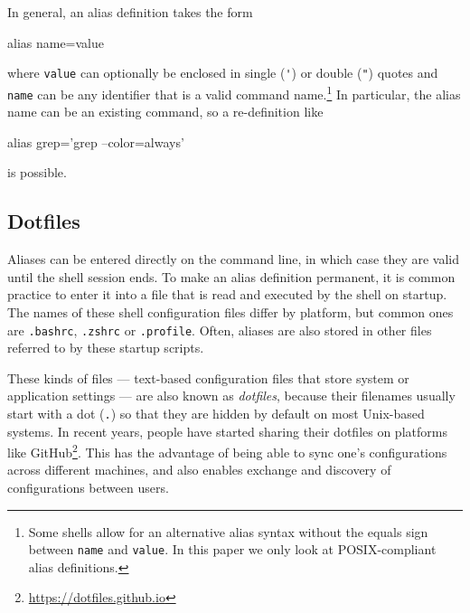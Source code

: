 

In general, an alias definition takes the form
\begin{CVerbatim}
alias name=value
\end{CVerbatim}
where \verb|value| can optionally be enclosed in single (\verb|'|) or double (\verb|"|) quotes and \verb|name| can be any identifier that is a valid command name.\footnote{Some shells allow for an alternative alias syntax without the equals sign between \texttt{name} and \texttt{value}. In this paper we only look at POSIX-compliant alias definitions.}
In particular, the alias name can be an existing command, so a re-definition like
\begin{CVerbatim}
alias grep='grep --color=always'
\end{CVerbatim}
is possible.

\subsection{Dotfiles}

Aliases can be entered directly on the command line, in which case they are valid until the shell session ends.
To make an alias definition permanent, it is common practice to enter it into a file that is read and executed by the shell on startup.
The names of these shell configuration files differ by platform, but common ones are \verb|.bashrc|, \verb|.zshrc| or \verb|.profile|.
Often, aliases are also stored in other files referred to by these startup scripts.

These kinds of files --- text-based configuration files that store system or application settings --- are also known as \emph{dotfiles}, because their filenames usually start with a dot (\verb|.|) so that they are hidden by default on most Unix-based systems.
In recent years, people have started sharing their dotfiles on platforms like GitHub\footnote{\url{https://dotfiles.github.io}}.
This has the advantage of being able to sync one's configurations across different machines, and also enables exchange and discovery of configurations between users.
